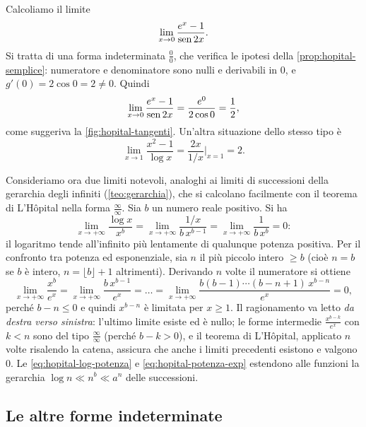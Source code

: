 Calcoliamo il limite
\begin{equation}\label{eq:hopital-es1}
  \lim_{x\to0}\frac{e^{x}-1}{\operatorname{sen}2x} .
\end{equation}
Si tratta di una forma indeterminata $\frac00$, che verifica le ipotesi della
\cref{prop:hopital-semplice}: numeratore e denominatore sono nulli e derivabili in $0$, e
$g'(0)=2\cos0=2\neq0$. Quindi
\[
  \lim_{x\to0}\frac{e^{x}-1}{\operatorname{sen}2x}=\frac{e^{0}}{2\cos0}=\frac12 ,
\]
come suggeriva la \cref{fig:hopital-tangenti}. Un'altra situazione dello stesso tipo è
\[
  \lim_{x\to1}\frac{x^{2}-1}{\log x}=\frac{2x}{1/x}\Big|_{x=1}=2 .
\]

Consideriamo ora due limiti notevoli, analoghi ai limiti di successioni della
gerarchia degli infiniti (\cref{teo:gerarchia}), che si calcolano facilmente con il
teorema di L'Hôpital nella forma $\frac\infty\infty$. Sia $b$ un numero reale
positivo. Si ha
\begin{equation}\label{eq:hopital-log-potenza}
  \lim_{x\to+\infty}\frac{\log x}{x^{b}}=\lim_{x\to+\infty}\frac{1/x}{b\,x^{b-1}}
  =\lim_{x\to+\infty}\frac1{b\,x^{b}}=0 :
\end{equation}
il logaritmo tende all'infinito più lentamente di qualunque potenza positiva. Per il
confronto tra potenza ed esponenziale, sia $n$ il più piccolo intero $\ge b$ (cioè
$n=b$ se $b$ è intero, $n=\lfloor b\rfloor+1$ altrimenti). Derivando $n$ volte il
numeratore si
ottiene
\begin{equation}\label{eq:hopital-potenza-exp}
  \lim_{x\to+\infty}\frac{x^{b}}{e^{x}}=\lim_{x\to+\infty}\frac{b\,x^{b-1}}{e^{x}}=\dots
  =\lim_{x\to+\infty}\frac{b(b-1)\cdots(b-n+1)\,x^{b-n}}{e^{x}}=0 ,
\end{equation}
perché $b-n\le0$ e quindi $x^{b-n}$ è limitata per $x\ge1$. Il ragionamento va letto
\emph{da destra verso sinistra}: l'ultimo limite esiste ed è nullo; le forme intermedie
$\frac{x^{b-k}}{e^{x}}$ con $k<n$ sono del tipo $\frac\infty\infty$ (perché $b-k>0$), e il
teorema di L'Hôpital, applicato $n$ volte risalendo la catena, assicura che anche i
limiti precedenti esistono e valgono $0$. Le \eqref{eq:hopital-log-potenza} e
\eqref{eq:hopital-potenza-exp} estendono alle funzioni la gerarchia
$\log n\ll n^{b}\ll a^{n}$ delle successioni.

\subsection{Le altre forme indeterminate}

